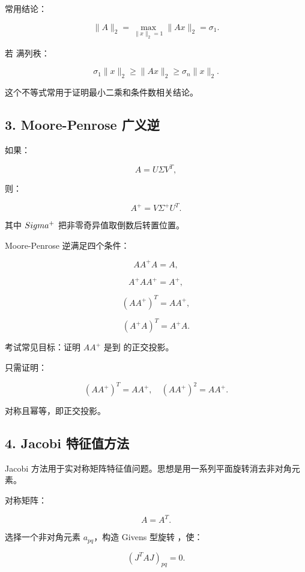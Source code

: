 \documentclass[11pt,a4paper]{ctexart}
\newcommand{\code}[1]{\begingroup\ttfamily\small #1\endgroup}
\begin{document}

常用结论：

\[
\|A\|_2=\max_{\|x\|_2=1}\|Ax\|_2=\sigma_1.
\]

若 \code{} 满列秩：

\[
\sigma_1\|x\|_2\ge \|Ax\|_2\ge \sigma_n\|x\|_2.
\]

这个不等式常用于证明最小二乘和条件数相关结论。


\subsection*{3. Moore-Penrose 广义逆}


如果：

\[
A=U\Sigma V^T,
\]

则：

\[
A^+=V\Sigma^+U^T.
\]

其中 $\\Sigma^+$ 把非零奇异值取倒数后转置位置。

Moore-Penrose 逆满足四个条件：

\[
AA^+A=A,
\]

\[
A^+AA^+=A^+,
\]

\[
(AA^+)^T=AA^+,
\]

\[
(A^+A)^T=A^+A.
\]

考试常见目标：证明 $AA^+$ 是到 \code{} 的正交投影。

只需证明：

\[
(AA^+)^T=AA^+,
\quad
(AA^+)^2=AA^+.
\]

对称且幂等，即正交投影。


\subsection*{4. Jacobi 特征值方法}


Jacobi 方法用于实对称矩阵特征值问题。思想是用一系列平面旋转消去非对角元素。

对称矩阵：

\[
A=A^T.
\]

选择一个非对角元素 $a_{pq}$，构造 Givens 型旋转 \code{}，使：

\[
(J^TAJ)_{pq}=0.
\]
\end{document}
